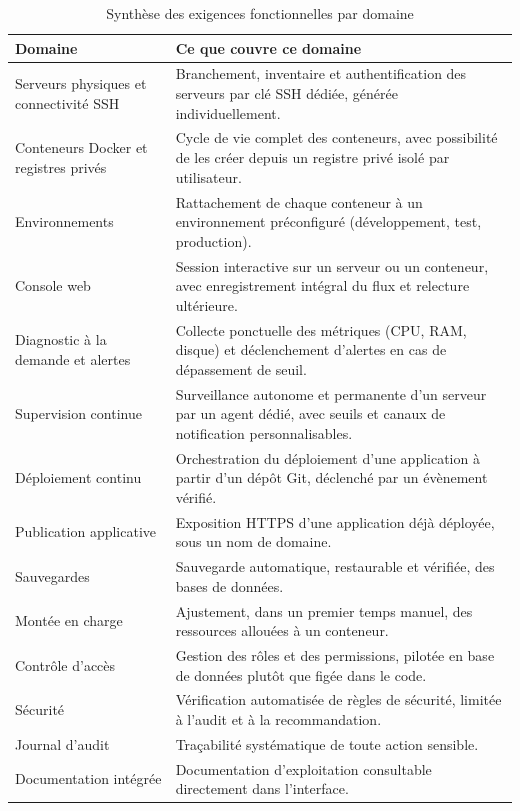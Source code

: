 \begin{table}[H]
\centering
\small
\renewcommand{\arraystretch}{1.3}
\begin{tabular}{p{4.2cm}p{9.2cm}}
\toprule
\textbf{Domaine} & \textbf{Ce que couvre ce domaine} \\
\midrule
Serveurs physiques et connectivité SSH & Branchement, inventaire et
  authentification des serveurs par clé SSH dédiée, générée
  individuellement. \\
Conteneurs Docker et registres privés & Cycle de vie complet des
  conteneurs, avec possibilité de les créer depuis un registre privé isolé
  par utilisateur.\\
Environnements & Rattachement de chaque conteneur à un environnement
  préconfiguré (développement, test, production). \\
Console web & Session interactive sur un serveur ou un conteneur, avec
  enregistrement intégral du flux et relecture ultérieure. \\
Diagnostic à la demande et alertes & Collecte ponctuelle des métriques
  (CPU, RAM, disque) et déclenchement d'alertes en cas de dépassement de
  seuil. \\
Supervision continue & Surveillance autonome et permanente d'un serveur
  par un agent dédié, avec seuils et canaux de notification
  personnalisables. \\
Déploiement continu & Orchestration du déploiement d'une application à
  partir d'un dépôt Git, déclenché par un évènement vérifié. \\
Publication applicative & Exposition HTTPS d'une application déjà
  déployée, sous un nom de domaine. \\
Sauvegardes & Sauvegarde automatique, restaurable et vérifiée, des bases
  de données. \\
Montée en charge & Ajustement, dans un premier temps manuel, des
  ressources allouées à un conteneur. \\
Contrôle d'accès & Gestion des rôles et des permissions,
  pilotée en base de données plutôt que figée dans le code. \\
Sécurité & Vérification automatisée de règles de sécurité, limitée à
  l'audit et à la recommandation. \\
Journal d'audit & Traçabilité systématique de toute action sensible. \\
Documentation intégrée & Documentation d'exploitation consultable
  directement dans l'interface. \\
\bottomrule
\end{tabular}
\caption{Synthèse des exigences fonctionnelles par domaine}
\label{tab:synthese-exigences}
\end{table}

